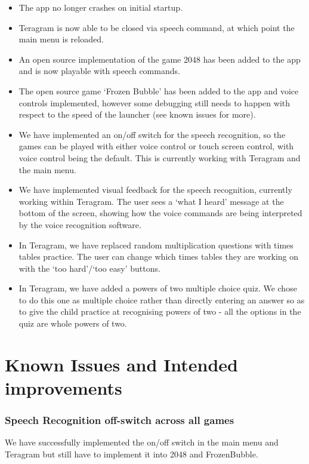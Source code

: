 \documentclass[11pt, oneside]{article}
\begin{document}
\begin{itemize}
	\item The app no longer crashes on initial startup.
	\item Teragram is now able to be closed via speech command, at
          which point the main menu is reloaded.
	\item An open source implementation of the game 2048 has been
          added to the app and is now playable with speech commands.
	\item The open source game `Frozen Bubble' has been added to
          the app and voice controls implemented, however some
          debugging still needs to happen with respect to the speed of
          the launcher (see known issues for more).
        \item We have implemented an on/off switch for the speech
          recognition, so the games can be played with either voice
          control or touch screen control, with voice control being
          the default. This is currently working with Teragram and the
          main menu.
        \item We have implemented visual feedback for the speech
          recognition, currently working within Teragram. The user
          sees a `what I heard' message at the bottom of the screen,
          showing how the voice commands are being interpreted by the
          voice recognition software.
        \item In Teragram, we have replaced random multiplication
          questions with times tables practice. The user can change
          which times tables they are working on with the `too
          hard'/`too easy' buttons.
        \item In Teragram, we have added a powers of two multiple
          choice quiz. We chose to do this one as multiple choice
          rather than directly entering an answer so as to give the
          child practice at recognising powers of two - all the
          options in the quiz are whole powers of two.
\end{itemize}

\pagebreak

\section{Known Issues and Intended improvements}

\subsubsection*{Speech Recognition off-switch across all games}
We have successfully implemented the on/off switch in the main menu and 
Teragram but still have to implement it into 2048 and FrozenBubble.
\end{document}
